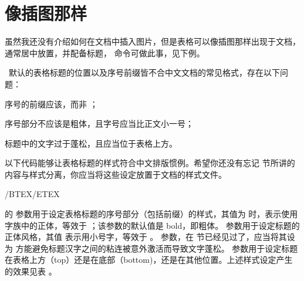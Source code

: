 \section{像插图那样}

虽然我还没有介绍如何在文档中插入图片，但是表格可以像插图那样出现于文档，通常居中放置，并配备标题， 命令可做此事，见下例。

\mainlanguage[en]
\startexample
{}
\stopexample
\simpleexample[option=TEX]{\null}
\getexample

\CONTEXT\ 默认的表格标题的位置以及序号前缀皆不合中文文档的常见格式，存在以下问题：

\startitemize[packed]
\item 序号的前缀应该，而非 ；
\item 序号部分不应该是粗体，且字号应当比正文小一号；
\item 标题中的文字过于蓬松，且应当位于表格上方。
\stopitemize

以下代码能够让表格标题的样式符合中文排版惯例。希望你还没有忘记 \in[style] 节所讲的内容与样式分离，你应当将这些设定放置于文档的样式文件。

\startTEX
\mainlanguage[cn]/BTEX/ETEX

\setupcaption
  [table][headstyle=normal, style=small, align=center, location=top]
\stopTEX

\noindent {} 的  参数用于设定表格标题的序号部分（包括前缀）的样式，其值为  时，表示使用字族中的正体，等效于 ；该参数的默认值是 bold，即粗体。 参数用于设定标题的正体风格，其值  表示用小号字，等效于 。 参数，在 \in[essay] 节已经见过了，应当将其设为  方能避免标题汉字之间的粘连被意外激活而导致文字蓬松。 参数用于设定标题在表格上方（top）还是在底部（bottom)，还是在其他位置。上述样式设定产生的效果见表 。

\mainlanguage[cn]
\setupcaption
  [table]
  [headstyle=normal, style=\tfx, align=center, location=top]

